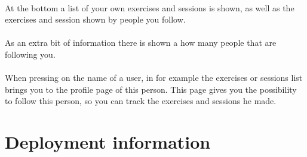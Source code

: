 \documentclass[11pt,a4paper]{scrartcl}
\begin{document}
\paragraph{}At the bottom a list of your own exercises and sessions is shown, as well as the exercises and session shown by people you follow.
\paragraph{}As an extra bit of information there is shown a how many people that are following you.
\paragraph{}When pressing on the name of a user, in for example the exercises or sessions list brings you to the profile page of this person. This page gives you the possibility to follow this person, so you can track the exercises and sessions he made.
\section{Deployment information}


\newpage        %

\newpage
\printindex                             %
\end{document}
